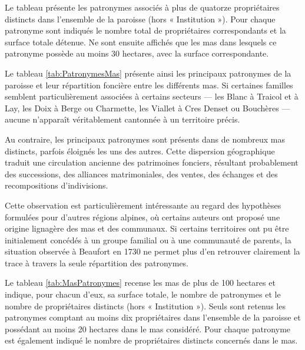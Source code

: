 \documentclass[12pt,a4paper]{report}
\begin{document}
Le tableau présente les patronymes associés à plus de quatorze propriétaires distincts dans l'ensemble de la paroisse (hors « Institution »). Pour chaque patronyme sont indiqués le nombre total de propriétaires correspondants et la surface totale détenue. Ne sont ensuite affichés que les mas dans lesquels ce patronyme possède au moins 30 hectares, avec la surface correspondante.

Le tableau \ref{tab:PatronymesMas} présente ainsi les principaux patronymes de la paroisse et leur répartition foncière entre les différents mas. Si certaines familles semblent particulièrement associées à certains secteurs — les Blanc à Traicol et à Lay, les Doix à Berge ou Charmette, les Viallet à Cres Denset ou Bouchères — aucune n'apparaît véritablement cantonnée à un territoire précis.

\medskip

Au contraire, les principaux patronymes sont présents dans de nombreux mas distincts, parfois éloignés les uns des autres. Cette dispersion géographique traduit une circulation ancienne des patrimoines fonciers, résultant probablement des successions, des alliances matrimoniales, des ventes, des échanges et des recompositions d'indivisions.

Cette observation est particulièrement intéressante au regard des hypothèses formulées pour d'autres régions alpines, où certains auteurs ont proposé une origine lignagère des mas et des communaux. Si certains territoires ont pu être initialement concédés à un groupe familial ou à une communauté de parents, la situation observée à Beaufort en 1730 ne permet plus d'en retrouver clairement la trace à travers la seule répartition des patronymes.

\begin{table}[H]
	\centering
	\resizebox{0.6\textwidth}{!}{%
		
	}
	\caption{Grands mas et principaux patronymes associés}
	\label{tab:MasPatronymes}
\end{table}

Le tableau \ref{tab:MasPatronymes} recense les mas de plus de 100 hectares et indique, pour chacun d'eux, sa surface totale, le nombre de patronymes et le nombre de propriétaires distincts (hors « Institution »). Seuls sont retenus les patronymes comptant au moins dix propriétaires dans l'ensemble de la paroisse et possédant au moins 20 hectares dans le mas considéré. Pour chaque patronyme est également indiqué le nombre de propriétaires distincts concernés dans le mas.
\end{document}
